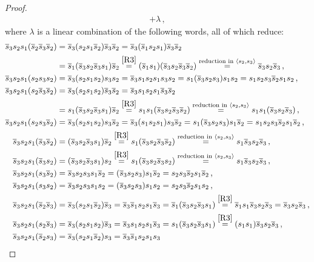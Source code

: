 \documentclass[12pt,reqno]{amsart}
\theoremstyle{definition}
\def\la{\langle}
\def\ra{\rangle}
\def\hs{\overline{s}}
\begin{document}
\begin{proof}
\begin{align*}
  + \lambda \,,
\end{align*}
where $\lambda$ is a linear combination of the following words, all of which reduce:
\begin{align*}
  \hs_3 s_2 s_1 (\hs_2 \hs_3 \hs_2)  & =  \hs_3 (s_2 s_1 \hs_2) \hs_3 \hs_2
  = \hs_3 (\hs_1 s_2 s_1) \hs_3 \hs_2 
\\
&= \hs_1 (\hs_3 s_2 \hs_3 s_1) \hs_2 
\overset{\eqref{R3}}{=} (\hs_1 s_1) (\hs_3 s_2 \hs_3 \hs_2)
\overset{\text{reduction in }\la s_2,s_3\ra}{=} \hs_3 s_2 \hs_3 \,,
\\
\hs_3 s_2 s_1 (s_2 s_3 s_2)  & = \hs_3 (s_2 s_1 s_2) s_3 s_2
= \hs_3 s_1 s_2 s_1 s_3 s_2 = s_1 (\hs_3 s_2 s_3) s_1 s_2 = s_1 s_2 s_3
\hs_2 s_1 s_2 \,,
\\
\hs_3 s_2 s_1 (s_2 \hs_3 \hs_2)  & = \hs_3 (s_2 s_1 s_2) \hs_3 \hs_2
= \hs_3 s_1 s_2 s_1 \hs_3 \hs_2  
\\
&= s_1 (\hs_3 s_2 \hs_3 s_1) \hs_2  \overset{\eqref{R3}}{=} s_1 s_1
(\hs_3 s_2 \hs_3 \hs_2 ) \overset{\text{reduction in }\la s_2,s_3\ra}{=} s_1 s_1
(\hs_3 s_2 \hs_3) \,,
\\
\hs_3 s_2 s_1 (s_2 s_3 \hs_2)  & = \hs_3 (s_2 s_1 s_2) s_3 \hs_2
= \hs_3 (s_1 s_2 s_1) s_3 \hs_2 = s_1 (\hs_3 s_2 s_3) s_1 \hs_2
= s_1 s_2 s_3 \hs_2 s_1 \hs_2  \,,
\\
\hs_3 s_2 s_1 (\hs_3 \hs_2)  & = (\hs_3 s_2 \hs_3 s_1) \hs_2
\overset{\eqref{R3}}{=} s_1 (\hs_3 s_2 \hs_3 \hs_2)
\overset{\text{reduction in }\la s_2,s_3\ra}{=} s_1 \hs_3 s_2 \hs_3 \,,
\\
\hs_3 s_2 s_1 (\hs_3 s_2)  & = (\hs_3 s_2 \hs_3 s_1) s_2
\overset{\eqref{R3}}{=} s_1 (\hs_3 s_2 \hs_3 s_2)
\overset{\text{reduction in }\la s_2,s_3\ra}{=} s_1 \hs_3 s_2 \hs_3 \,,
\\
\hs_3 s_2 s_1 (s_3 \hs_2)  & = \hs_3 s_2 s_3 s_1 \hs_2
= (\hs_3 s_2 s_3) s_1 \hs_2 = s_2 s_3 \hs_2 s_1 \hs_2 \,,
\\
\hs_3 s_2 s_1 (s_3 s_2)  & = \hs_3 s_2 s_3 s_1 s_2
= (\hs_3 s_2 s_3) s_1 s_2 = s_2 s_3 \hs_2 s_1 s_2 \,,
\\
\hs_3 s_2 s_1 (\hs_2 \hs_3)  & = \hs_3 (s_2 s_1 \hs_2) \hs_3
= \hs_3 \hs_1 s_2 s_1 \hs_3 = \hs_1 (\hs_3 s_2 \hs_3 s_1)
\overset{\eqref{R3}}{=} \hs_1 s_1 \hs_3 s_2 \hs_3 = \hs_3 s_2 \hs_3 \,,
\\
\hs_3 s_2 s_1 (s_2 \hs_3)  & = \hs_3 (s_2 s_1 s_2) \hs_3 = \hs_3 s_1 s_2 s_1 \hs_3
= s_1 (\hs_3 s_2 \hs_3 s_1) \overset{\eqref{R3}}{=} (s_1 s_1) \hs_3 s_2 \hs_3 \,,
\\
\hs_3 s_2 s_1 (\hs_2 s_3)  & = \hs_3 (s_2 s_1 \hs_2) s_3 = \hs_3 \hs_1 s_2 s_1 s_3

\end{align*}
\end{proof}
\end{document}
